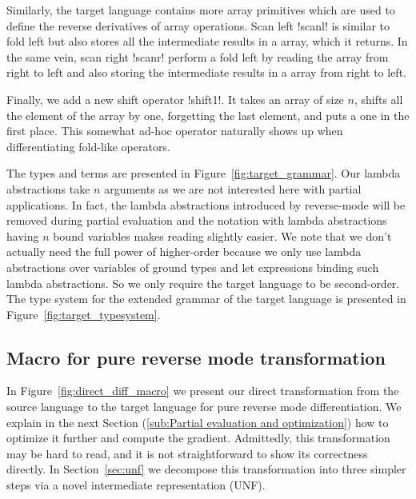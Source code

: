 Similarly, the target language contains more array primitives which are used to define the reverse derivatives of array operations. 
Scan left !scanl! is similar to fold left but also stores all the intermediate results in a array, which it returns.
In the same vein, scan right !scanr! perform a fold left by reading the array from right to left and also storing 
the intermediate results in a array from right to left.

Finally, we add a new shift operator !shift1!. 
It takes an array of size $n$,  shifts all the element of the array by one, 
forgetting the last element, and puts a one in the first place. 
This somewhat ad-hoc operator naturally shows up when differentiating fold-like operators.

The types and terms are presented in Figure~\ref{fig:target_grammar}.
Our lambda abstractions take $n$ arguments as we are not interested here with partial applications. 
In fact, the lambda abstractions introduced by reverse-mode will be removed during partial evaluation 
and the notation with lambda abstractions having $n$ bound variables makes reading slightly easier.
We note that we don't actually need the full power of higher-order because we only use lambda abstractions over variables of ground types
and let expressions binding such lambda abstractions. So we only require the target language to be second-order.
The type system for the extended grammar of the target language is presented in Figure~\ref{fig:target_typesystem}. 





\subsection{Macro for pure reverse mode transformation} %
\label{sub:Macro for pure reverse mode transformation}

In Figure~\ref{fig:direct_diff_macro} we present our direct transformation from the source language to the target language for pure reverse mode differentiation.
We explain in the next Section (\ref{sub:Partial evaluation and optimization}) how to optimize it further and compute the gradient.
Admittedly, this transformation may be hard to read, and it is not straightforward to show its correctness directly. 
In Section~\ref{sec:unf} we decompose this transformation into three simpler steps via a novel intermediate representation (UNF).

